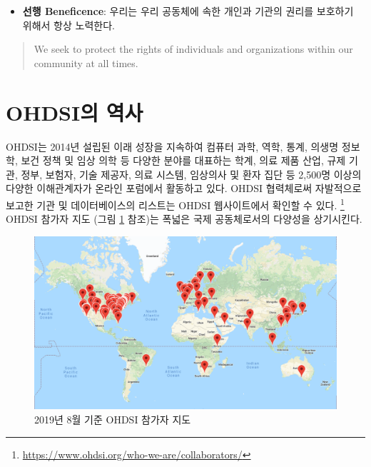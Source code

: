 \documentclass[10.5pt]{book}
\providecommand{\tightlist}{%
  \setlength{\itemsep}{0pt}\setlength{\parskip}{0pt}}
\let\rmarkdownfootnote\footnote%
\def\footnote{\protect\rmarkdownfootnote}
\theoremstyle{definition}
\theoremstyle{definition}
\theoremstyle{definition}
\theoremstyle{remark}
\begin{document}
\begin{itemize}
\tightlist
\item
  \textbf{선행 Beneficence}: 우리는 우리 공동체에 속한 개인과 기관의
  권리를 보호하기 위해서 항상 노력한다.
\end{itemize}

\begin{quote}
We seek to protect the rights of individuals and organizations within
our community at all times.
\end{quote}


\hypertarget{ohdsi-}{\section{OHDSI의 역사}\label{ohdsi-}}

OHDSI는 2014년 설립된 이래 성장을 지속하여 컴퓨터 과학, 역학, 통계,
의생명 정보학, 보건 정책 및 임상 의학 등 다양한 분야를 대표하는 학계,
의료 제품 산업, 규제 기관, 정부, 보험자, 기술 제공자, 의료 시스템,
임상의사 및 환자 집단 등 2,500명 이상의 다양한 이해관계자가 온라인
포럼에서 활동하고 있다. OHDSI 협력체로써 자발적으로 보고한 기관 및
데이터베이스의 리스트는 OHDSI 웹사이트에서 확인할 수 있다. \footnote{\url{https://www.ohdsi.org/who-we-are/collaborators/}}
OHDSI 참가자 지도 (그림 \ref{fig:collaboratormap} 참조)는 폭넓은 국제
공동체로서의 다양성을 상기시킨다.

\begin{figure}

{\centering \includegraphics[width=1\linewidth]{images/OhdsiCommunity/mapOfCollaborators} 

}

\caption{2019년 8월 기준 OHDSI 참가자 지도}\label{fig:collaboratormap}
\end{figure}
\end{document}

